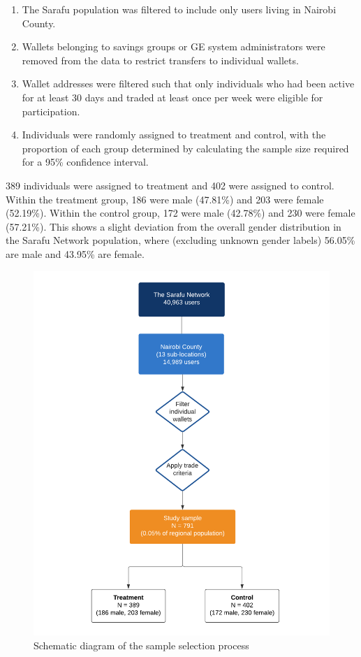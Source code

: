 \documentclass[12pt]{article}
\begin{document}
\begin{enumerate}
    \item The Sarafu population was filtered to include only users living in Nairobi County.
    \item Wallets belonging to savings groups or GE system administrators were removed from the data to restrict transfers to individual wallets.
    \item Wallet addresses were filtered such that only individuals who had been active for at least 30 days and traded at least once per week were eligible for participation.
    \item Individuals were randomly assigned to treatment and control, with the proportion of each group determined by calculating the sample size required for a 95\% confidence interval.
\end{enumerate}

389 individuals were assigned to treatment and 402 were assigned to control. Within the treatment group, 186 were male (47.81\%) and 203 were female (52.19\%). Within the control group, 172 were male (42.78\%) and 230 were female (57.21\%). This shows a slight deviation from the overall gender distribution in the Sarafu Network population, where (excluding unknown gender labels) 56.05\% are male and 43.95\% are female.

\begin{figure}[hp]
    \centering
    \includegraphics[width=.9\textwidth]{figures/fig_5}
    \caption{Schematic diagram of the sample selection process}
    \label{fig:fig5}
\end{figure}
\end{document}
